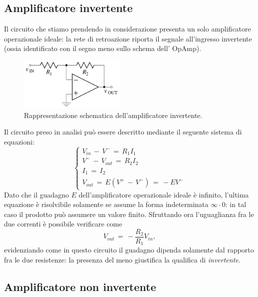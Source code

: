 \subsection{Amplificatore invertente}

Il circuito che stiamo prendendo in considerazione presenta un solo amplificatore operazionale ideale: la rete di retroazione
riporta il segnale all'ingresso invertente (ossia identificato con  il segno meno sullo schema dell' OpAmp).
\begin{figure}[H]
    \centering
    \includegraphics[width=0.45\textwidth]{Immagini/AmplificatoreInvertente.png}
    \caption{Rappresentazione schematica dell'amplificatore invertente.}
    \label{figure: OpAmp}
\end{figure}
Il circuito preso in analisi può essere descritto mediante il seguente sistema di equazioni:
\begin{equation}
    \begin{cases}
        V_{in}\,-\,V^{-}\,=\,R_1I_1 \\
        V^-\,-\,V_{out}\,=\,R_2I_2  \\
        I_1\,=\,I_2 \\
        V_{out}\,=\,E\left(V^+\,-\,V^-\right)\,=\,-EV^-
    \end{cases}
    \label{equation: sistema_AmpInv}
\end{equation}
Dato che il guadagno $E$ dell'amplificatore operazionale ideale è infinito, l'ultima equazione è risolvibile solamente se
assume la forma indeterminata $\infty \cdot 0$: in tal caso il prodotto può assumere un valore finito. Sfruttando ora 
l'uguaglianza fra le due correnti è possibile verificare come
\begin{equation}
    V_{out}\,=\,-\frac{R_2}{R_1}V_{in},
    \label{equation: Vout_AmpInv}
\end{equation}
evidenziando come in questo circuito il guadagno dipenda solamente dal rapporto fra le due resistenze: la presenza del meno
giustifica la qualifica di \textit{invertente}.

\subsection{Amplificatore non invertente}

